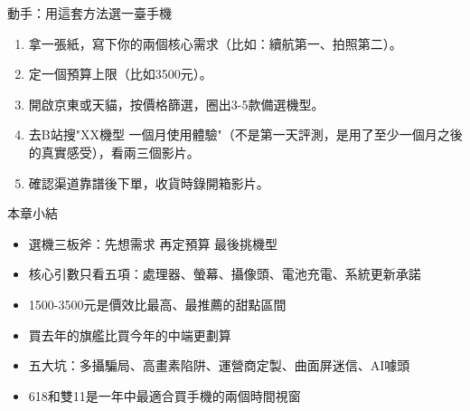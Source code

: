 \begin{tcbpractice}{動手：用這套方法選一臺手機}
\begin{enumerate}
  \item 拿一張紙，寫下你的兩個核心需求（比如：續航第一、拍照第二）。
  \item 定一個預算上限（比如3500元）。
  \item 開啟京東或天貓，按價格篩選，圈出3-5款備選機型。
  \item 去B站搜"XX機型 一個月使用體驗"（不是第一天評測，是用了至少一個月之後的真實感受），看兩三個影片。
  \item 確認渠道靠譜後下單，收貨時錄開箱影片。
\end{enumerate}

\end{tcbpractice}

\begin{tcbsummary}{本章小結}
\begin{itemize}
  \item 選機三板斧：先想需求 再定預算 最後挑機型
  \item 核心引數只看五項：處理器、螢幕、攝像頭、電池充電、系統更新承諾
  \item 1500-3500元是價效比最高、最推薦的甜點區間
  \item 買去年的旗艦比買今年的中端更劃算
  \item 五大坑：多攝騙局、高畫素陷阱、運營商定製、曲面屏迷信、AI噱頭
  \item 618和雙11是一年中最適合買手機的兩個時間視窗
\end{itemize}

\end{tcbsummary}
